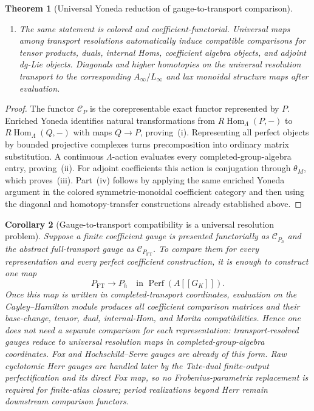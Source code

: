 \documentclass[11pt]{article}
\newtheorem{theorem}{Theorem}[section]
\newtheorem{corollary}[theorem]{Corollary}
\theoremstyle{definition}
\begin{document}
\begin{theorem}[Universal Yoneda reduction of gauge-to-transport comparison]
\begin{enumerate}[label=\textnormal{(\roman*)}]
\item The same statement is colored and coefficient-functorial.  Universal
maps among transport resolutions automatically induce compatible comparisons
for tensor products, duals, internal Homs, coefficient algebra objects, and
adjoint dg-Lie objects.  Diagonals and higher homotopies on the universal
resolution transport to the corresponding $A_\infty/L_\infty$ and lax
monoidal structure maps after evaluation.
\end{enumerate}
\end{theorem}

\begin{proof}
The functor $\mathcal C_P$ is the corepresentable exact functor represented by
$P$.  Enriched Yoneda identifies natural transformations from
$R\operatorname{Hom}_{\Lambda}(P,-)$ to
$R\operatorname{Hom}_{\Lambda}(Q,-)$ with maps $Q\to P$, proving~(i).
Representing all perfect objects by bounded projective complexes turns
precomposition into ordinary matrix substitution.  A continuous
$\Lambda$-action evaluates every completed-group-algebra entry, proving~(ii).
For adjoint coefficients this action is conjugation through $\theta_M$, which
proves~(iii).  Part~(iv) follows by applying the same enriched Yoneda argument
in the colored symmetric-monoidal coefficient category and then using the
diagonal and homotopy-transfer constructions already established above.
\end{proof}

\begin{corollary}[Gauge-to-transport compatibility is a universal resolution problem]\label{cor:gauge-transport-universal-problem}
Suppose a finite coefficient gauge is presented functorially as
$\mathcal C_{P_h}$ and the abstract full-transport gauge as
$\mathcal C_{P_{\mathrm{FT}}}$.  To compare them for every representation and
every perfect coefficient construction, it is enough to construct one map
\[
 P_{\mathrm{FT}}\longrightarrow P_h
 \quad\text{in }\operatorname{Perf}(A[[G_K]]).
\]
Once this map is written in completed-transport coordinates, evaluation on
the Cayley--Hamilton module produces all coefficient comparison matrices and
their base-change, tensor, dual, internal-Hom, and Morita compatibilities.
Hence one does not need a separate comparison for each representation:
transport-resolved gauges reduce to universal resolution maps in
completed-group-algebra coordinates.  Fox and Hochschild--Serre gauges are
already of this form.  Raw cyclotomic Herr gauges are handled later by the
Tate-dual finite-output perfectification and its direct Fox map, so no
Frobenius-parametrix replacement is required for finite-atlas closure; period
realizations beyond Herr remain downstream comparison functors.
\end{corollary}
\end{document}
